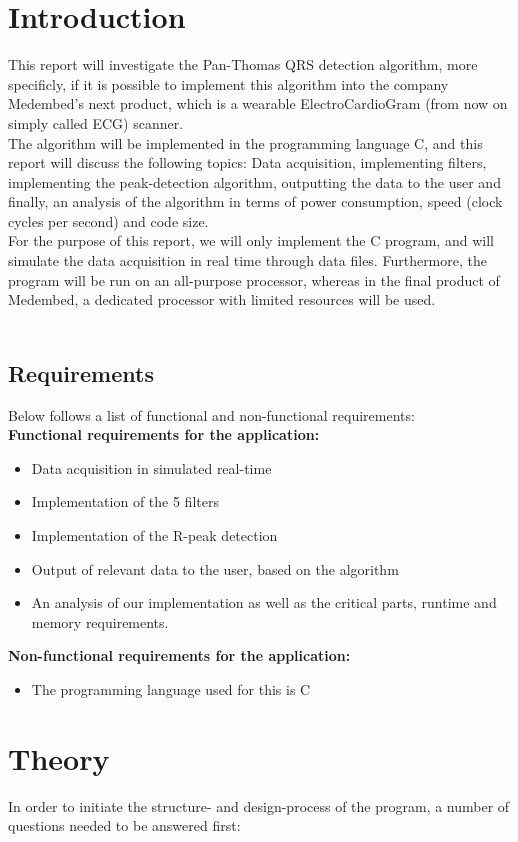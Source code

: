 \documentclass[12pt,a4paper]{article}
\begin{document}
\section{Introduction}
	This report will investigate the Pan-Thomas QRS detection algorithm, more specificly, if it is possible to implement this algorithm into the company Medembed's next product, which is a wearable ElectroCardioGram (from now on simply called ECG) scanner.\\
	The algorithm will be implemented in the programming language C, and this report will discuss the following topics: Data acquisition, implementing filters, implementing the peak-detection algorithm, outputting the data to the user and finally, an analysis of the algorithm in terms of power consumption, speed (clock cycles per second) and code size.\\
	For the purpose of this report, we will only implement the C program, and will simulate the data acquisition in real time through data files. Furthermore, the program will be run on an all-purpose processor, whereas in the final product of Medembed, a dedicated processor with limited resources will be used.\\
\\
\subsection{Requirements}
Below follows a list of functional and non-functional requirements:\\

\textbf{ Functional requirements for the application:}
\begin{itemize}
	\item Data acquisition in simulated real-time
	\item Implementation of the 5 filters
	\item Implementation of the R-peak detection
	\item Output of relevant data to the user, based on the algorithm
	\item An analysis of our implementation as well as the critical parts, runtime and memory requirements.
\end{itemize}
\textbf{Non-functional requirements for the application:}
\begin {itemize}
	\item The programming language used for this is C
\end{itemize}

\section{Theory}
 	In order to initiate the structure- and design-process of the program, a number of questions needed to be answered first:\\
 	
\end{document}
